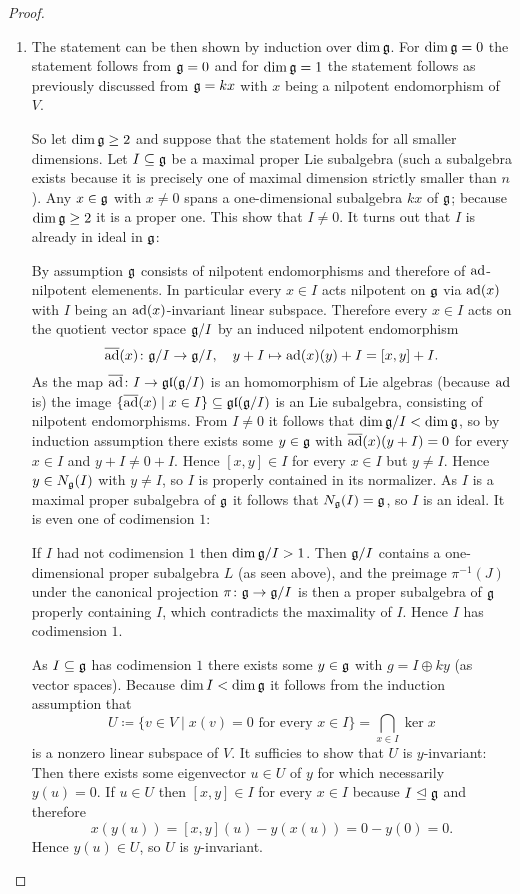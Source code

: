 \begin{proof}
 \begin{enumerate}[leftmargin=*]
  \item
   The statement can be then shown by induction over $\dim \mathfrak{g}$. For $\dim \mathfrak{g} = 0$ the statement follows from $\mathfrak{g} = 0$ and for $\dim \mathfrak{g} = 1$ the statement follows as previously discussed from $\mathfrak{g} = k x$ with $x$ being a nilpotent endomorphism of $V$.
   
   So let $\dim \mathfrak{g} \geq 2$ and suppose that the statement holds for all smaller dimensions. Let $I \subseteq \mathfrak{g}$ be a maximal proper Lie subalgebra (such a subalgebra exists because it is precisely one of maximal dimension strictly smaller than $n$). Any $x \in \mathfrak{g}$ with $x \neq 0$ spans a one-dimensional subalgebra $k x$ of $\mathfrak{g}$; because $\dim \mathfrak{g} \geq 2$ it is a proper one. This show that $I \neq 0$. It turns out that $I$ is already in ideal in $\mathfrak{g}$:
   
   By assumption $\mathfrak{g}$ consists of nilpotent endomorphisms and therefore of $\operatorname{ad}$-nilpotent elemenents. In particular every $x \in I$ acts nilpotent on $\mathfrak{g}$ via $\operatorname{ad}(x)$ with $I$ being an $\operatorname{ad}(x)$-invariant linear subspace. Therefore every $x \in I$ acts on the quotient vector space $\mathfrak{g}/I$ by an induced nilpotent endomorphism
   \[
    \overline{\operatorname{ad}}(x) \colon \mathfrak{g}/I \to \mathfrak{g}/I, \quad y + I \mapsto \operatorname{ad}(x)(y) + I = [x,y] + I.
   \]
   As the map $\overline{\operatorname{ad}} \colon I \to \mathfrak{gl}(\mathfrak{g}/I)$ is an homomorphism of Lie algebras (because $\operatorname{ad}$ is) the image $\{\overline{\operatorname{ad}}(x) \mid x \in I\} \subseteq \mathfrak{gl}(\mathfrak{g}/I)$ is an Lie subalgebra, consisting of nilpotent endomorphisms. From $I \neq 0$ it follows that $\dim \mathfrak{g}/I < \dim \mathfrak{g}$, so by induction assumption there exists some $y \in \mathfrak{g}$ with $\overline{\operatorname{ad}}(x)(y+I) = 0$ for every $x \in I$ and $y+I \neq 0+I$. Hence $[x,y] \in I$ for every $x \in I$ but $y \neq I$. Hence $y \in N_{\mathfrak{g}}(I)$ with $y \neq I$, so $I$ is properly contained in its normalizer. As $I$ is a maximal proper subalgebra of $\mathfrak{g}$ it follows that $N_{\mathfrak{g}}(I) = \mathfrak{g}$, so $I$ is an ideal. It is even one of codimension $1$:
   
   If $I$ had not codimension $1$ then $\dim \mathfrak{g}/I > 1$. Then $\mathfrak{g}/I$ contains a one-dimensional proper subalgebra $L$ (as seen above), and the preimage $\pi^{-1}(J)$ under the canonical projection $\pi \colon \mathfrak{g} \to \mathfrak{g}/I$ is then a proper subalgebra of $\mathfrak{g}$ properly containing $I$, which contradicts the maximality of $I$. Hence $I$ has codimension $1$.

   As $I \subseteq \mathfrak{g}$ has codimension $1$ there exists some $y \in \mathfrak{g}$ with $g = I \oplus ky$ (as vector spaces). Because $\dim I < \dim \mathfrak{g}$ it follows from the induction assumption that
   \[
    U \coloneqq \{v \in V \mid \text{$x(v) = 0$ for every $x \in I$}\} = \bigcap_{x \in I} \ker x
   \]
   is a nonzero linear subspace of $V$. It sufficies to show that $U$ is $y$-invariant: Then there exists some eigenvector $u \in U$ of $y$ for which necessarily $y(u) = 0$. If $u\in U$ then $[x,y] \in I$ for every $x \in I$ because $I \trianglelefteq \mathfrak{g}$ and therefore
   \[
    x(y(u)) = [x,y](u) - y(x(u)) = 0 - y(0) = 0.
   \]
   Hence $y(u) \in U$, so $U$ is $y$-invariant.
   

\end{enumerate}
\end{proof}
